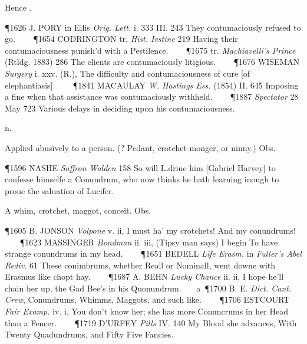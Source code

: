 \begin{description}[wide, labelwidth=!, labelindent=0pt]
\begin{myenumerate}
\noindent
Hence .

\P 1626 J. PORY in  Ellis \textit{Orig. Lett.} i. 333 III. 243 They contumaciously refused to go.    
\P 1654 CODRINGTON tr.  \textit{Hist. Ivstine} 219 Having their contumaciousness punish'd with a Pestilence.    
\P 1675 tr.  \textit{Machiavelli's Prince} (Rtldg. 1883) 286 The clients are contumaciously litigious.    
\P 1676 WISEMAN  \textit{Surgery} i. xxv. (R.), The difficulty and contumaciousness of cure [of elephantiasis].    
\P 1841 MACAULAY  \textit{W. Hastings Ess.} (1854) II. 645 Imposing a fine when that assistance was contumaciously withheld.    
\P 1887 \textit{Spectator} 28 May 723 Various delays in deciding upon his contumaciousness.
\end{myenumerate}


 n.

\noindent {}

\vspace{-0.3cm}

\begin{myenumerate}

 Applied abusively to a person. (? Pedant, crotchet-monger, or ninny.) Obs.

\P 1596 NASHE  \textit{Saffron Walden} 158 So will I‥driue him [Gabriel Harvey] to confesse himselfe a Conundrum, who now thinks he hath learning inough to proue the saluation of Lucifer.

 A whim, crotchet, maggot, conceit. Obs.

\P 1605 B. JONSON  \textit{Volpone} v. ii, I must ha' my crotchets! And my conundrums!    
\P 1623 MASSINGER  \textit{Bondman} ii. iii, (Tipsy man says) I begin To have strange conundrums in my head.    
\P 1651 BEDELL  \textit{Life Erasm.} in \textit{Fuller's Abel Rediv.} 61 These conimbrums, whether Reall or Nominall, went downe with Erasmus like chopt hay.    
\P 1687 A. BEHN  \textit{Lucky Chance} ii. ii, I hope he'll chain her up, the Gad Bee's in his Quonundrum.    a 
\P 1700 B. E. \textit{Dict.  Cant. Crew}, Conundrums, Whimms, Maggots, and such like.    
\P 1706 ESTCOURT  \textit{Fair Examp.} iv. i, You don't know her; she has more Conuncrums in her Head than a Fencer.    
\P 1719 D'URFEY  \textit{Pills} IV. 140 My Blood she advances, With Twenty Quadundrums, and Fifty Five Fancies.


\end{myenumerate}
\end{description}

